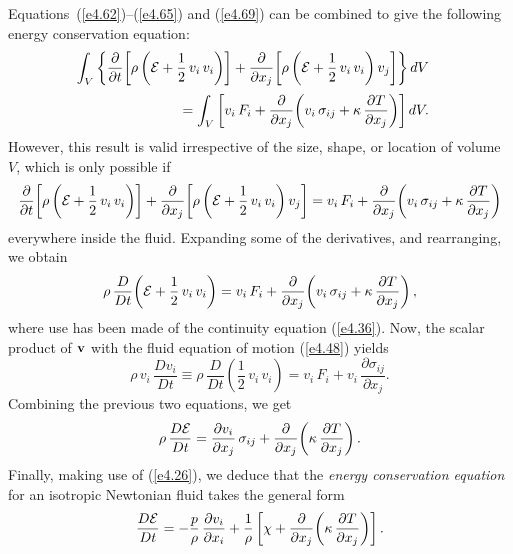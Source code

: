 Equations~(\ref{e4.62})--(\ref{e4.65}) and (\ref{e4.69}) can be combined to give the following energy conservation equation:
\begin{eqnarray}
\int_V\left\{\frac{\partial}{\partial t}\!\left[\rho\left({\cal E}+ \frac{1}{2}\,v_i\,v_i\right)\right]
+\frac{\partial}{\partial x_j}\!\left[\rho\left({\cal E}+\frac{1}{2}\,v_i\,v_i\right)v_j\right]\right\}dV &&\nonumber\\[0.5ex]
= \int_V\left[v_i\,F_i + \frac{\partial}{\partial x_j}\!\left(v_i\,\sigma_{ij} + \kappa\,\frac{\partial T}{\partial x_j}\right)\right]dV.&&
\end{eqnarray}
However, this result is valid irrespective of the size, shape, or location of  volume $V$, which is only
possible if
\begin{equation}
\frac{\partial}{\partial t}\!\left[\rho\left({\cal E}+ \frac{1}{2}\,v_i\,v_i\right)\right]
+\frac{\partial}{\partial x_j}\!\left[\rho\left({\cal E}+\frac{1}{2}\,v_i\,v_i\right)v_j\right]
= v_i\,F_i + \frac{\partial}{\partial x_j}\!\left(v_i\,\sigma_{ij} + \kappa\,\frac{\partial T}{\partial x_j}\right)
\end{equation}
everywhere inside the fluid. Expanding some of the derivatives, and rearranging, we obtain
\begin{equation}
\rho\,\frac{D}{D t}\!\left({\cal E}+ \frac{1}{2}\,v_i\,v_i\right)
= v_i\,F_i + \frac{\partial}{\partial x_j}\!\left(v_i\,\sigma_{ij} + \kappa\,\frac{\partial T}{\partial x_j}\right),
\end{equation}
where use has been made of the continuity equation (\ref{e4.36}).
Now, the scalar product of ${\bf v}$ with the fluid equation of motion (\ref{e4.48}) yields
\begin{equation}
\rho\,v_i\,\frac{D v_i}{Dt} \equiv \rho\,\frac{D}{Dt}\!\left(\frac{1}{2}\,v_i\,v_i\right) = v_i\,F_i + v_i\,\frac{\partial \sigma_{ij}}{\partial x_j}.
\end{equation}
Combining the previous two equations, we get
\begin{equation}
\rho\,\frac{D{\cal E}}{Dt} = \frac{\partial v_i}{\partial x_j} \,\sigma_{ij}+ \frac{\partial}{\partial x_j}\!\left(\kappa\,\frac{\partial T}{\partial x_j}\right).
\end{equation}
Finally, making use of (\ref{e4.26}), we deduce that the {\em energy conservation equation}\/ for an isotropic Newtonian fluid
takes the general form
\begin{equation}\label{e4.66}
\frac{D{\cal E}}{Dt} = - \frac{p}{\rho}\,\frac{\partial v_i}{\partial x_i} + \frac{1}{\rho}\left[\chi + \frac{\partial}{\partial x_j}\!\left(
\kappa\,\frac{\partial T}{\partial x_j}\right)\right].
\end{equation}

